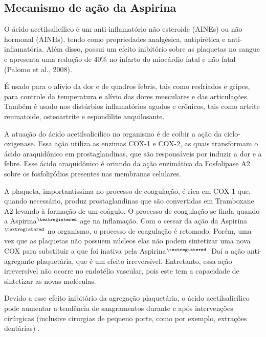     \subsection{Mecanismo de ação da Aspirina}

     O ácido acetilsalicílico é um anti-inflamatório não esteroide (AINEs) ou não hormonal (AINHs), tendo como       propriedades analgésica, antipirética e anti-inflamatória. Além disso, possui um efeito inibitório sobre
     as plaquetas no sangue e apresenta uma redução de 40\% no infarto do miocárdio fatal e não fatal (Palomo
     et al., 2008).

     É usado para o alívio da dor e de quadros febris, tais como resfriados e gripes, para controle da
     temperatura e alívio das dores musculares e das articulações. Também é usado nos distúrbios inflamatórios
     agudos e crônicos, tais como artrite reumatoide, osteoartrite e espondilite
     anquilosante.\cite{bulaaspirina}

     A atuação do ácido acetilsalicílico no organismo é de coibir a ação da ciclo-oxigenase. Essa ação utiliza
     as enzimas COX-1 e COX-2, as quais transformam o ácido araquidônico em prostaglandinas, que são
     responsáveis por induzir a dor e a febre. Esse ácido araquidônico é oriundo da ação enzimática da
     Fosfolipase A2 sobre os fosfolipídios presentes nas membranas celulares. 

     A plaqueta, importantíssima no processo de coagulação, é rica em COX-1 que, quando necessário, produz
     prostaglandinas que são convertidas em Tramboxane A2 levando à formação de um coágulo. O processo de
     coagulação se finda quando a Aspirina$^{\tiny{\textregistered}}$ age na inflamação. Com o cessar da ação
     da Aspirina$^{\tiny{\textregistered}}$ no organismo, o processo de coagulação é retomado. Porém, uma vez
     que as plaquetas não possuem núcleos elas não podem sintetizar uma nova COX para substituir a que foi
     inativa pela Aspirina$^{\tiny{\textregistered}}$. Daí a ação anti-agregante plaquetária, que é um efeito
     irreversível. Entretanto, essa ação irreversível não ocorre no endotélio vascular, pois este tem a
     capacidade de sintetizar as novas moléculas. 

     Devido a esse efeito inibitório da agregação plaquetária, o ácido acetilsalicílico pode aumentar a
     tendência de sangramentos durante e após intervenções cirúrgicas (inclusive cirurgias de pequeno porte,
     como por exemplo, extrações dentárias) \cite{bulaaspirina}.

